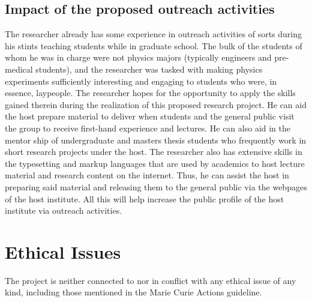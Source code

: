 \documentclass[a4paper,11pt,color]{article}
\begin{document}
\subsection{Impact of the proposed outreach activities}
\label{sec:benefit_outreach}
The researcher already has some experience in outreach activities of sorts during his stints teaching students while in graduate school. The bulk of the students of whom he was in charge were not physics majors (typically engineers and pre-medical students), and the researcher was tasked with making physics experiments sufficiently interesting and engaging to students who were, in essence, laypeople. The researcher hopes for the opportunity to apply the skills gained therein during the realization of this proposed research project. He can aid the host prepare material to deliver when students and the general public visit the group to receive first-hand experience and lectures. He can also aid in the mentor ship of undergraduate and masters thesis students who frequently work in short research projects under the host. The researcher also has extensive skills in the typesetting and markup languages that are used by academics to host lecture material and research content on the internet. Thus, he can assist 
the 
host in preparing said material and releasing them to the general public via the webpages of the host institute. All this will help increase the public profile of the host institute via outreach activities.

\section{Ethical Issues}
\label{sec:ethical_issues}
The project is neither connected to nor in conflict with any ethical issue of any kind, including
those mentioned in the Marie Curie Actions guideline.
\end{document}

